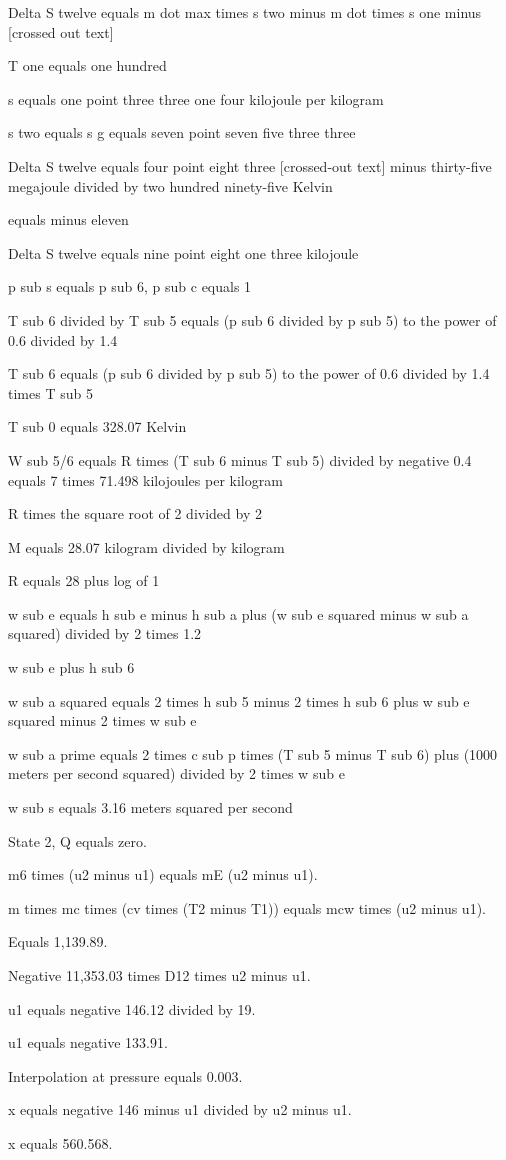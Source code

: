 Delta S twelve equals m dot max times s two minus m dot times s one minus [crossed out text]

T one equals one hundred

s equals one point three three one four kilojoule per kilogram

s two equals s g equals seven point seven five three three

Delta S twelve equals four point eight three [crossed-out text] minus thirty-five megajoule divided by two hundred ninety-five Kelvin

equals minus eleven

Delta S twelve equals nine point eight one three kilojoule

p sub s equals p sub 6, p sub c equals 1

T sub 6 divided by T sub 5 equals (p sub 6 divided by p sub 5) to the power of 0.6 divided by 1.4

T sub 6 equals (p sub 6 divided by p sub 5) to the power of 0.6 divided by 1.4 times T sub 5

T sub 0 equals 328.07 Kelvin

W sub 5/6 equals R times (T sub 6 minus T sub 5) divided by negative 0.4 equals 7 times 71.498 kilojoules per kilogram

R times the square root of 2 divided by 2

M equals 28.07 kilogram divided by kilogram

R equals 28 plus log of 1

w sub e equals h sub e minus h sub a plus (w sub e squared minus w sub a squared) divided by 2 times 1.2

w sub e plus h sub 6

w sub a squared equals 2 times h sub 5 minus 2 times h sub 6 plus w sub e squared minus 2 times w sub e

w sub a prime equals 2 times c sub p times (T sub 5 minus T sub 6) plus (1000 meters per second squared) divided by 2 times w sub e

w sub s equals 3.16 meters squared per second

State 2, Q equals zero.

m6 times (u2 minus u1) equals mE (u2 minus u1).

m times mc times (cv times (T2 minus T1)) equals mcw times (u2 minus u1).

Equals 1,139.89.

Negative 11,353.03 times D12 times u2 minus u1.

u1 equals negative 146.12 divided by 19.

u1 equals negative 133.91.

Interpolation at pressure equals 0.003.

x equals negative 146 minus u1 divided by u2 minus u1.

x equals 560.568.
